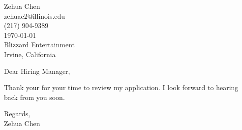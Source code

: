 \documentclass[letterpaper, 12pt]{article}
\begin{document}
  Zehua Chen \\
  zehuac2@illinois.edu \\
  (217) 904-9389 \\
  \today \\
  Blizzard Entertainment \\
  Irvine, California

  \vspace{12pt}
  Dear Hiring Manager,

  \vspace{12pt}
  

  Thank your for your time to review my application. I look forward to hearing
  back from you soon.

  \vspace{12pt}
  Regards, \\
  Zehua Chen
\end{document}
